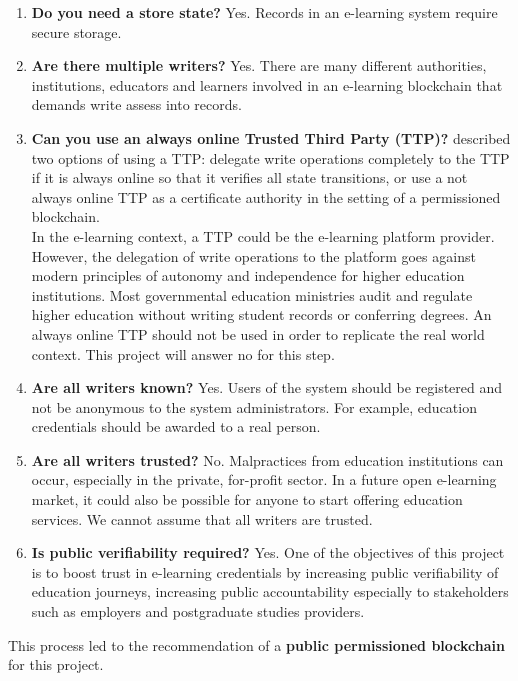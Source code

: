 \begin{enumerate}
	\item \textbf{Do you need a store state?} Yes. Records in an e-learning system require secure storage.
	\item \textbf{Are there multiple writers?} Yes. There are many different authorities, institutions, educators and learners
	      involved in an e-learning blockchain that demands write assess into records.
	\item \textbf{Can you use an always online Trusted Third Party (TTP)?} \citet[p.2]{wust2017you} described two options of
	      using a TTP: delegate write operations completely to the TTP if it is always online so that it verifies all state
	      transitions, or use a not always online TTP as a certificate authority in the setting of a permissioned blockchain.\\
	      In the e-learning context, a TTP could be the e-learning platform provider. However, the delegation of write operations
	      to the platform goes against modern principles of autonomy and independence for higher education institutions.
	      Most governmental education ministries audit and regulate higher education without writing student
	      records or conferring degrees. An always online TTP should not be used in order to replicate the real world context. This
	      project will answer no for this step.
	\item \textbf{Are all writers known?} Yes. Users of the system should be registered and not be anonymous to the system
	      administrators. For example, education credentials should be awarded to a real person.
	\item \textbf{Are all writers trusted?} No. Malpractices from education institutions can occur, especially in the private,
	      for-profit sector. In a future open e-learning market, it could also be possible for anyone to start offering education
	      services. We cannot assume that all writers are trusted.
	\item \textbf{Is public verifiability required?} Yes. One of the objectives of this project is to boost trust in e-learning
	      credentials by increasing public verifiability of education journeys, increasing public accountability especially to
	      stakeholders such as employers and postgraduate studies providers.
\end{enumerate}

This process led to the recommendation of a \textbf{public permissioned blockchain} for this project.

